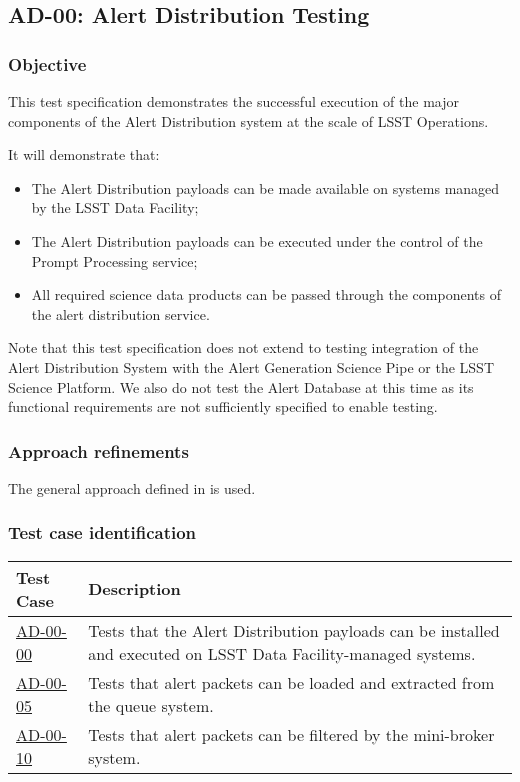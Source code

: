 \subsection{AD-00: Alert Distribution Testing}
\label{ad-00}

\subsubsection{Objective}

This test specification demonstrates the successful execution of the major components of the Alert Distribution system at the scale of LSST Operations.

It will demonstrate that:

\begin{itemize}

  \item{The Alert Distribution payloads 
	  can be made available on systems managed by the
  LSST Data Facility;}

  \item{The Alert Distribution payloads can be executed under the
  control of the Prompt Processing service;}

  \item{All required science data products can be passed through the components
	  of the alert distribution service.}

\end{itemize}

Note that this test specification does not extend to 
testing integration of the Alert Distribution System with the Alert Generation Science Pipe or the LSST Science Platform. 
We also do not test the Alert Database at this time as its functional requirements are not sufficiently specified to enable testing.

\subsubsection{Approach refinements}

The general approach defined in  is used.

\subsubsection{Test case identification}

\begin{longtable} {|p{}|p{}|}\hline
\textbf{Test Case}  & \textbf{Description} \\\hline

\hyperref[ad-00-00]{AD-00-00} & Tests that the Alert Distribution payloads can be installed and executed on LSST Data Facility-managed systems.\\\hline
\hyperref[ad-00-05]{AD-00-05} & Tests that alert packets can be loaded and extracted from the queue system. \\\hline
\hyperref[ad-00-10]{AD-00-10} & Tests that alert packets can be filtered by the mini-broker system. \\\hline
\end{longtable}
